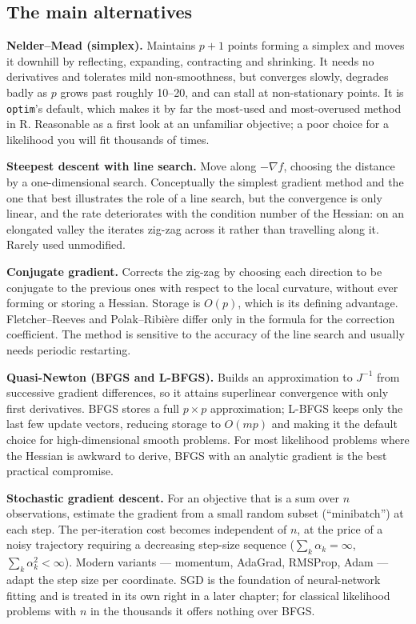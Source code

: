 \documentclass[
  letterpaper,
  DIV=11,
  numbers=noendperiod]{scrreprt}
\begin{document}
\subsection{The main alternatives}\label{the-main-alternatives}

\textbf{Nelder--Mead (simplex).} Maintains \(p+1\) points forming a
simplex and moves it downhill by reflecting, expanding, contracting and
shrinking. It needs no derivatives and tolerates mild non-smoothness,
but converges slowly, degrades badly as \(p\) grows past roughly 10--20,
and can stall at non-stationary points. It is \texttt{optim}'s default,
which makes it by far the most-used and most-overused method in R.
Reasonable as a first look at an unfamiliar objective; a poor choice for
a likelihood you will fit thousands of times.

\textbf{Steepest descent with line search.} Move along \(-\nabla f\),
choosing the distance by a one-dimensional search. Conceptually the
simplest gradient method and the one that best illustrates the role of a
line search, but the convergence is only linear, and the rate
deteriorates with the condition number of the Hessian: on an elongated
valley the iterates zig-zag across it rather than travelling along it.
Rarely used unmodified.

\textbf{Conjugate gradient.} Corrects the zig-zag by choosing each
direction to be conjugate to the previous ones with respect to the local
curvature, without ever forming or storing a Hessian. Storage is
\(O(p)\), which is its defining advantage. Fletcher--Reeves and
Polak--Ribière differ only in the formula for the correction
coefficient. The method is sensitive to the accuracy of the line search
and usually needs periodic restarting.

\textbf{Quasi-Newton (BFGS and L-BFGS).} Builds an approximation to
\(J^{-1}\) from successive gradient differences, so it attains
superlinear convergence with only first derivatives. BFGS stores a full
\(p \times p\) approximation; L-BFGS keeps only the last few update
vectors, reducing storage to \(O(mp)\) and making it the default choice
for high-dimensional smooth problems. For most likelihood problems where
the Hessian is awkward to derive, BFGS with an analytic gradient is the
best practical compromise.

\textbf{Stochastic gradient descent.} For an objective that is a sum
over \(n\) observations, estimate the gradient from a small random
subset (``minibatch'') at each step. The per-iteration cost becomes
independent of \(n\), at the price of a noisy trajectory requiring a
decreasing step-size sequence (\(\sum_k \alpha_k = \infty\),
\(\sum_k \alpha_k^2 < \infty\)). Modern variants --- momentum, AdaGrad,
RMSProp, Adam --- adapt the step size per coordinate. SGD is the
foundation of neural-network fitting and is treated in its own right in
a later chapter; for classical likelihood problems with \(n\) in the
thousands it offers nothing over BFGS.
\end{document}
